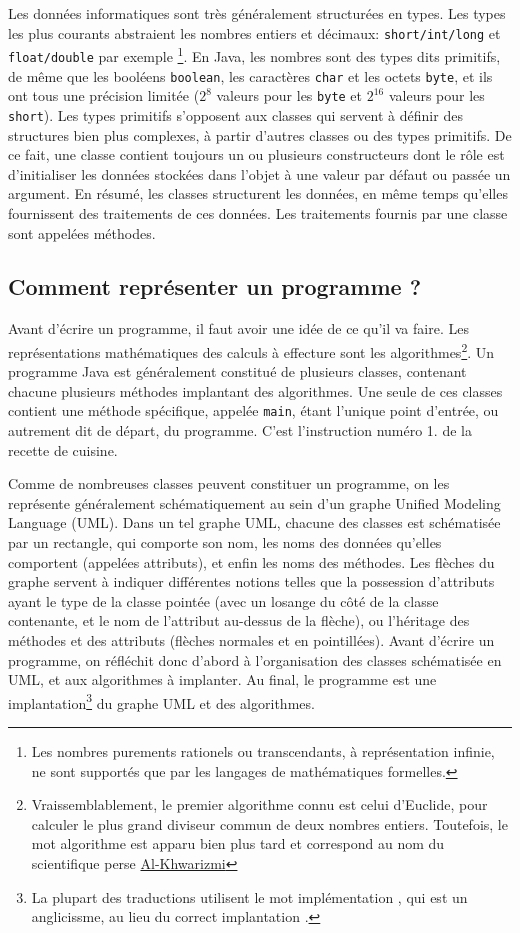 \documentclass[10pt]{article}
\begin{document}
Les données informatiques sont très généralement structurées en types. Les types les plus courants
abstraient les nombres entiers et décimaux: \texttt{short/int/long} et \texttt{float/double} par exemple
\footnote{Les nombres purements rationels ou transcendants, à représentation infinie, ne sont supportés que par les langages de mathématiques formelles.}.
En Java, les nombres sont des types dits primitifs, de même que les booléens \texttt{boolean}, les caractères \texttt{char} et les octets \texttt{byte},
et ils ont tous une précision limitée ($2^8$ valeurs pour les \texttt{byte} et $2^{16}$ valeurs pour les \texttt{short}).
Les types primitifs s'opposent aux classes qui servent à définir des structures bien plus complexes, à partir d'autres classes
ou des types primitifs. De ce fait, une classe contient toujours un ou plusieurs constructeurs dont
le rôle est d'initialiser les données stockées dans l'objet à une valeur par défaut ou passée un argument.
En résumé, les classes structurent les données, en même temps qu'elles fournissent des traitements de ces données.
Les traitements fournis par une classe sont appelées méthodes.


\subsection{Comment représenter un programme ?}

Avant d'écrire un programme, il faut avoir une idée de ce qu'il va faire. Les représentations
mathématiques des calculs à effecture sont les algorithmes\footnote{Vraissemblablement, le premier algorithme connu est celui
  d'Euclide, pour calculer le plus grand diviseur commun de deux nombres entiers. Toutefois, le mot algorithme est
  apparu bien plus tard et correspond au nom du scientifique perse \href{https://fr.wikipedia.org/wiki/Al-Khw\%C3\%A2rizm\%C3\%AE}{Al-Khwarizmi}}.
Un programme Java est généralement constitué de plusieurs classes, contenant chacune plusieurs méthodes implantant des algorithmes.
Une seule de ces classes contient une méthode spécifique, appelée \texttt{main}, étant l'unique point d'entrée, ou autrement dit de départ, du programme.
C'est l'instruction numéro 1. de la recette de cuisine.

Comme de nombreuses classes peuvent constituer un programme, on les représente généralement schématiquement au sein d'un graphe
Unified Modeling Language (UML). Dans un tel graphe UML, chacune des classes est schématisée par un rectangle, qui comporte son nom,
les noms des données qu'elles comportent (appelées attributs), et enfin les noms des méthodes. Les flèches du graphe servent
à indiquer différentes notions telles que la possession d'attributs ayant le type de la classe pointée
(avec un losange du côté de la classe contenante, et le nom de l'attribut au-dessus de la flèche), ou l'héritage des méthodes
et des attributs (flèches normales et en pointillées). Avant d'écrire un programme, on réfléchit donc d'abord à l'organisation des
classes schématisée en UML, et aux algorithmes à implanter. Au final, le programme est une implantation\footnote{La plupart des traductions
utilisent le mot \og implémentation \fg, qui est un anglicissme, au lieu du correct \og implantation \fg.}
du graphe UML et des algorithmes.
\end{document}
